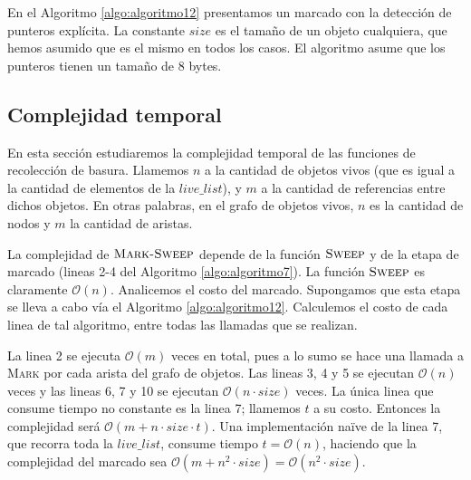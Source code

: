 \begin{algorithm}
	\dontprintsemicolon
	\Output{-}
 	\BlankLine
\caption{$\textsc{Mark}$}
\label{algo:algoritmo12}
\end{algorithm}

En el Algoritmo \ref{algo:algoritmo12} presentamos un marcado con la detección de punteros explícita. La constante $size$ es el tamaño de un objeto cualquiera, que hemos asumido que es el mismo en todos los casos. El algoritmo asume que los punteros tienen un tamaño de 8 bytes.

\subsection{Complejidad temporal}

En esta sección estudiaremos la complejidad temporal de las funciones de recolección de basura. Llamemos $n$ a la cantidad de objetos vivos (que es igual a la cantidad de elementos de la $live\_list$), y $m$ a la cantidad de referencias entre dichos objetos. En otras palabras, en el grafo de objetos vivos, $n$ es la cantidad de nodos y $m$ la cantidad de aristas.

La complejidad de $\textsc{Mark-Sweep}$ depende de la función $\textsc{Sweep}$ y de la etapa de marcado (lineas 2-4 del Algoritmo \ref{algo:algoritmo7}). La función $\textsc{Sweep}$ es claramente $\mathcal{O}(n)$. Analicemos el costo del marcado. Supongamos que esta etapa se lleva a cabo vía el Algoritmo \ref{algo:algoritmo12}. Calculemos el costo de cada linea de tal algoritmo, entre todas las llamadas que se realizan. 

La linea 2 se ejecuta $\mathcal{O}(m)$ veces en total, pues a lo sumo se hace una llamada a \textsc{Mark} por cada arista del grafo de objetos. Las lineas 3, 4 y 5 se ejecutan $\mathcal{O}(n)$ veces y las lineas 6, 7 y 10 se ejecutan $\mathcal{O}(n \cdot size)$ veces. La única linea que consume tiempo no constante es la linea 7; llamemos $t$ a su costo. Entonces la complejidad será $\mathcal{O}(m + n \cdot size \cdot t)$. Una implementación naïve de la linea 7, que recorra toda la $live\_list$, consume tiempo $t = \mathcal{O}(n)$, haciendo que la complejidad del marcado sea $\mathcal{O}(m + n^2 \cdot size) = \mathcal{O}(n^2 \cdot size)$.

